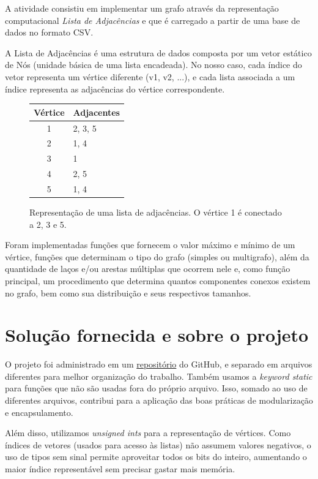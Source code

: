 \documentclass[a4paper, 12pt]{article}
\begin{document}
A atividade consistiu em implementar um grafo através da representação computacional
\textit{Lista de Adjacências} e que é carregado a partir de uma base de dados no
formato CSV.

A Lista de Adjacências é uma estrutura de dados composta por um vetor estático
de Nós (unidade básica de uma lista encadeada). No nosso caso, cada índice do
vetor representa um vértice diferente (v1, v2, ...), e cada lista associada a um
índice representa as adjacências do vértice correspondente.

\begin{figure}[h]
\centering
\begin{tabular}{c|l}
Vértice & Adjacentes \\ \hline
1 & 2, 3, 5 \\
2 & 1, 4 \\
3 & 1 \\
4 & 2, 5 \\
5 & 1, 4 \\
\end{tabular}
\caption{Representação de uma lista de adjacências. O vértice 1 é
conectado a 2, 3 e 5.}
\end{figure}

Foram implementadas funções que fornecem o valor máximo e mínimo de um vértice,
funções que determinam o tipo do grafo (simples ou multigrafo), além da quantidade
de laços e/ou arestas múltiplas que ocorrem nele e, como função principal, um
procedimento que determina quantos componentes conexos existem no grafo, bem como
sua distribuição e seus respectivos tamanhos.

\newpage
\section{Solução fornecida e sobre o projeto}

O projeto foi administrado em um \href{https://github.com/atomicpenguinz/TEG_1}{repositório}
do GitHub, e separado em arquivos diferentes para melhor organização do trabalho.
Também usamos a \textit{keyword static} para funções que não são usadas fora do
próprio arquivo. Isso, somado ao uso de diferentes arquivos, contribui para a
aplicação das boas práticas de modularização e encapsulamento.

Além disso, utilizamos \textit{unsigned ints} para a representação de vértices. Como
índices de vetores (usados para acesso às listas) não assumem valores negativos,
o uso de tipos sem sinal permite aproveitar todos os bits do inteiro, aumentando
o maior índice representável sem precisar gastar mais memória.
\end{document}
